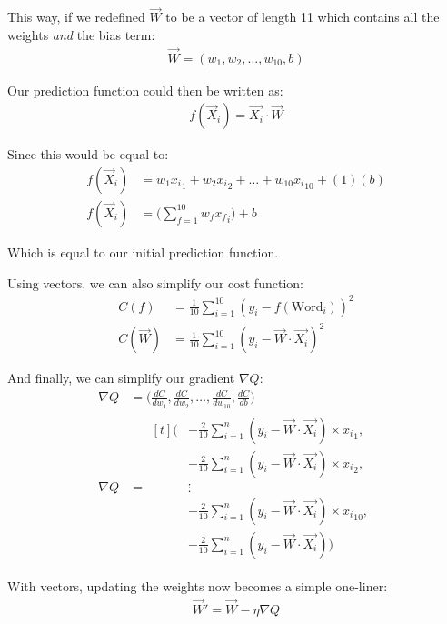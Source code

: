 \documentclass[12pt, demo]{article}
\begin{document}
This way, if we redefined $\vec{W}$ to be a vector of length 11 which contains all the weights \textit{and} the bias term:
\begin{align*}
	\vec{W} = (w_1, w_2, \dots, w_{10}, b)
\end{align*}

Our prediction function could then be written as:
\begin{align*}
	f(\vec{X}_i) = \vec{X_i} \cdot \vec{W}
\end{align*}

Since this would be equal to:
\begin{align*}
	f(\vec{X}_i) & = w_1{x_i}_1 + w_2{x_i}_2 + \dots + w_{10}{x_i}_{10} + (1)(b)
	\\
	f(\vec{X}_i) & = \Big(\sum_{f=1}^{10} w_f{x_f}_i\Big) + b
\end{align*}

Which is equal to our initial prediction function.

\bigskip

Using vectors, we can also simplify our cost function:
\begin{align*}
	C(f)       & = \frac{1}{10} \sum_{i=1}^{10} (y_i - f(\text{Word}_i))^2
	\\
	C(\vec{W}) & = \frac{1}{10} \sum_{i=1}^{10} (y_i - \vec{W} \cdot \vec{X_i})^2
\end{align*}

And finally, we can simplify our gradient $\nabla Q$:
\begin{align*}
	\nabla Q & = \Big(\frac{dC}{dw_1}, \frac{dC}{dw_2}, \dots, \frac{dC}{dw_{10}}, \frac{dC}{db}\Big)
	\\
	\nabla Q & =
	\begin{aligned}[t]
		\Big(
		 & -\frac{2}{10} \sum_{i=1}^{n} (y_i - \vec{W} \cdot \vec{X_i}) \times {x_i}_1,
		\\
		 & -\frac{2}{10} \sum_{i=1}^{n} (y_i - \vec{W} \cdot \vec{X_i}) \times {x_i}_2,
		\\
		 & \vdots
		\\
		 & -\frac{2}{10} \sum_{i=1}^{n} (y_i - \vec{W} \cdot \vec{X_i}) \times {x_i}_{10},
		\\
		 & -\frac{2}{10} \sum_{i=1}^{n} (y_i - \vec{W} \cdot \vec{X_i})
		\Big)
	\end{aligned}
\end{align*}

With vectors, updating the weights now becomes a simple one-liner:
\begin{align*}
	\vec{W}' = \vec{W} - \eta\nabla Q
\end{align*}
\end{document}
